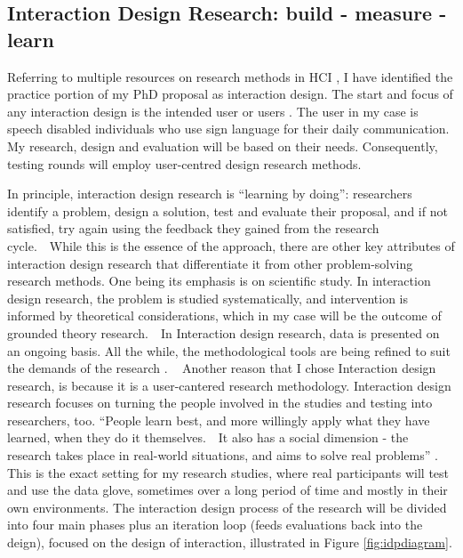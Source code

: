 \subsection{Interaction Design Research: build - measure - learn}

Referring to multiple resources on research methods in HCI \parencite{Cox2008}  \parencite{Dix2004}  \parencite{Lazar2010}  \parencite{Zimmerman:2007:RTD:1240624.1240704}, I have identified the practice portion of my PhD proposal as interaction design. The start and focus of any interaction design is the intended user or users \parencite{Dix2004}. The user in my case is speech disabled individuals who use sign language for their daily communication. My research, design and evaluation will be based on their needs. Consequently, testing rounds will employ user-centred design research methods.

In principle, interaction design research is ``learning by doing'': researchers identify a problem, design a solution, test and evaluate their proposal, and if not satisfied, try again using the feedback they gained from the research cycle.  While this is the essence of the approach, there are other key attributes of interaction design research that differentiate it from other problem-solving research methods. One being its emphasis is on scientific study. In interaction design research, the problem is studied systematically, and intervention is informed by theoretical considerations, which in my case will be the outcome of grounded theory research.  In Interaction design research, data is presented on an ongoing basis. All the while, the methodological tools are being refined to suit the demands of the research \parencite{OBrienRoryFacultyofInformationStudies2001}. 
 
Another reason that I chose Interaction design research, is because it is a user-cantered research methodology. Interaction design research focuses on turning the people involved in the studies and testing into researchers, too. ``People learn best, and more willingly apply what they have learned, when they do it themselves.  It also has a social dimension - the research takes place in real-world situations, and aims to solve real problems'' \parencite{OBrienRoryFacultyofInformationStudies2001}. This is the exact setting for my research studies, where real participants will test and use the data glove, sometimes over a long period of time and mostly in their own environments.
The interaction design process \parencite{Dix2004} of the research will be divided into four main phases plus an iteration loop (feeds evaluations back into the deign), focused on the design of interaction, illustrated in Figure \ref{fig:idpdiagram}.

